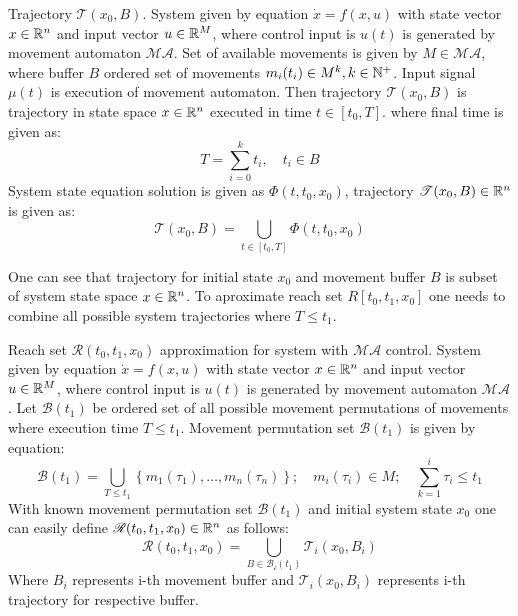 \begin{definition}{Trajectory $\mathscr{T}(x_0,B)$.}\label{def:movementTrajectory} 
    System given by equation $\dot{x}=f(x,u)$ with state vector $x\in \mathbb{R}^n$ and input vector $u \in \mathbb{R}^M$, where control input is $u(t)$ is generated by movement automaton $\mathscr{MA}$. Set of available movements is given by $M\in\mathscr{MA}$, where buffer $B$ ordered set of movements $m_i(t_i)\in M^k, k\in \mathbb{N}^+$. Input signal $\mu(t)$ is execution of movement automaton. Then trajectory $\mathscr{T}(x_0,B)$ is trajectory in state space $x\in\mathbb{R}^n$  executed in time $t\in [t_0,T]$. where final time is given as:
    \begin{equation}
        T= \sum_{i=0}^{k} t_i,\quad t_i\in B 
    \end{equation}
    System state equation solution is given as $\Phi(t,t_0,x_0)$, trajectory $\mathscr{T}(x_0,B)\in \mathbb{R}^n$ is given as:
    \begin{equation}
        \mathscr{T}(x_0,B)= \bigcup_{t\in[t_0,T]} \Phi(t,t_0,x_0)
    \end{equation}
\end{definition}
\noindent One can see that trajectory for initial state $x_0$ and movement buffer $B$ is subset of system state space $x\in\mathbb{R}^n$. To aproximate reach set $R[t_0,t_1,x_0]$ one needs to combine all possible system trajectories where $T\le t_1$.
\begin{definition}{Reach set $\mathscr{R}(t_0,t_1,x_0)$ approximation for system with $\mathscr{MA}$ control.}\label{def:NumericReachSet3D}
    System given by equation $\dot{x}=f(x,u)$ with state vector $x\in \mathbb{R}^n$ and input vector $u \in \mathbb{R}^M$, where control input is $u(t)$ is generated by movement automaton $\mathscr{MA}$. Let  $\mathscr{B}(t_1)$ be ordered set of all possible movement permutations of movements where execution time $T\le t_1$. Movement permutation set $\mathscr{B}(t_1)$ is given by equation:
    \begin{equation}
        \mathscr{B}(t_1) = \bigcup_{T\le t_1} \left\{ m_1(\tau_1),\dots,m_n(\tau_n)\right\};\quad m_i(\tau_i)\in M;\quad \sum_{k=1}^i \tau_i \le t_1
    \end{equation}
    With known movement permutation set $\mathscr{B}(t_1)$ and initial system state $x_0$ one can easily define $\mathscr{R}(t_0,t_1,x_0)\in \mathbb{R}^n$ as follows:
    \begin{equation}
        \mathscr{R}(t_0,t_1,x_0)=\bigcup_{B\in\mathscr{B_i}(t_1)} \mathscr{T}_i(x_0,B_i) 
    \end{equation}
    Where $B_i$ represents i-th movement buffer and $\mathscr{T}_i(x_0,B_i)$ represents i-th trajectory for respective buffer.
\end{definition}
